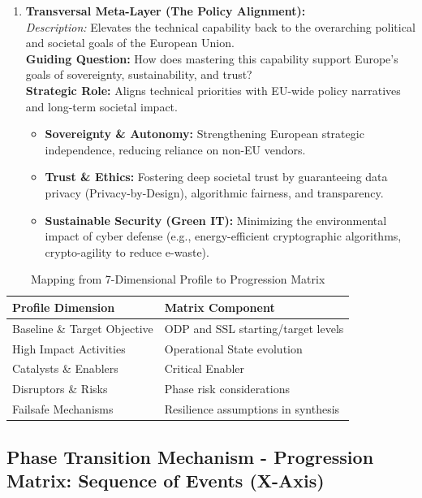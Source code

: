 \documentclass{ieeeaccess}
\begin{document}
\begin{enumerate}
    \item \textbf{Transversal Meta-Layer (The Policy Alignment):}\\
    \textit{Description:} Elevates the technical capability back to the overarching political and societal goals of the European Union.\\
    \textbf{Guiding Question:} How does mastering this capability support Europe's goals of sovereignty, sustainability, and trust?\\
    \textbf{Strategic Role:} Aligns technical priorities with EU-wide policy narratives and long-term societal impact.
    \begin{itemize}
        \item \textbf{Sovereignty \& Autonomy:} Strengthening European strategic independence, reducing reliance on non-EU vendors.
        \item \textbf{Trust \& Ethics:} Fostering deep societal trust by guaranteeing data privacy (Privacy-by-Design), algorithmic fairness, and transparency.
        \item \textbf{Sustainable Security (Green IT):} Minimizing the environmental impact of cyber defense (e.g., energy-efficient cryptographic algorithms, crypto-agility to reduce e-waste).
    \end{itemize}
\end{enumerate}

\begin{table}[h!]
\centering
\caption{Mapping from 7-Dimensional Profile to Progression Matrix}
\begin{tabular}{p{5cm} p{6cm}}
\toprule
\textbf{Profile Dimension} & \textbf{Matrix Component} \\
\midrule
Baseline \& Target Objective & ODP and SSL starting/target levels \\
High Impact Activities & Operational State evolution \\
Catalysts \& Enablers & Critical Enabler \\
Disruptors \& Risks & Phase risk considerations \\
Failsafe Mechanisms & Resilience assumptions in synthesis \\
\bottomrule
\end{tabular}
\end{table}

\subsection{Phase Transition Mechanism - Progression Matrix: Sequence of Events (X-Axis)}
\end{document}
